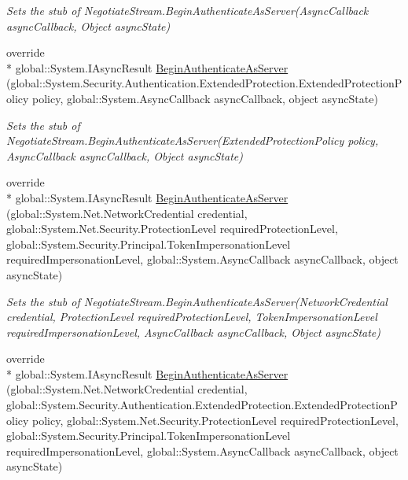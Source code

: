 \begin{DoxyCompactItemize}
\begin{DoxyCompactList}\small\item\em Sets the stub of Negotiate\-Stream.\-Begin\-Authenticate\-As\-Server(\-Async\-Callback async\-Callback, Object async\-State)\end{DoxyCompactList}\item 
override \\*
global\-::\-System.\-I\-Async\-Result \hyperlink{class_system_1_1_net_1_1_security_1_1_fakes_1_1_stub_negotiate_stream_a2509030a133fbc4d908a1617c0d02ad0}{Begin\-Authenticate\-As\-Server} (global\-::\-System.\-Security.\-Authentication.\-Extended\-Protection.\-Extended\-Protection\-Policy policy, global\-::\-System.\-Async\-Callback async\-Callback, object async\-State)
\begin{DoxyCompactList}\small\item\em Sets the stub of Negotiate\-Stream.\-Begin\-Authenticate\-As\-Server(\-Extended\-Protection\-Policy policy, Async\-Callback async\-Callback, Object async\-State)\end{DoxyCompactList}\item 
override \\*
global\-::\-System.\-I\-Async\-Result \hyperlink{class_system_1_1_net_1_1_security_1_1_fakes_1_1_stub_negotiate_stream_aa791f66489633a5dbf1a7ebba1645144}{Begin\-Authenticate\-As\-Server} (global\-::\-System.\-Net.\-Network\-Credential credential, global\-::\-System.\-Net.\-Security.\-Protection\-Level required\-Protection\-Level, global\-::\-System.\-Security.\-Principal.\-Token\-Impersonation\-Level required\-Impersonation\-Level, global\-::\-System.\-Async\-Callback async\-Callback, object async\-State)
\begin{DoxyCompactList}\small\item\em Sets the stub of Negotiate\-Stream.\-Begin\-Authenticate\-As\-Server(\-Network\-Credential credential, Protection\-Level required\-Protection\-Level, Token\-Impersonation\-Level required\-Impersonation\-Level, Async\-Callback async\-Callback, Object async\-State)\end{DoxyCompactList}\item 
override \\*
global\-::\-System.\-I\-Async\-Result \hyperlink{class_system_1_1_net_1_1_security_1_1_fakes_1_1_stub_negotiate_stream_a7a73ef9278c100778854eb585efb4c5c}{Begin\-Authenticate\-As\-Server} (global\-::\-System.\-Net.\-Network\-Credential credential, global\-::\-System.\-Security.\-Authentication.\-Extended\-Protection.\-Extended\-Protection\-Policy policy, global\-::\-System.\-Net.\-Security.\-Protection\-Level required\-Protection\-Level, global\-::\-System.\-Security.\-Principal.\-Token\-Impersonation\-Level required\-Impersonation\-Level, global\-::\-System.\-Async\-Callback async\-Callback, object async\-State)

\end{DoxyCompactItemize}
